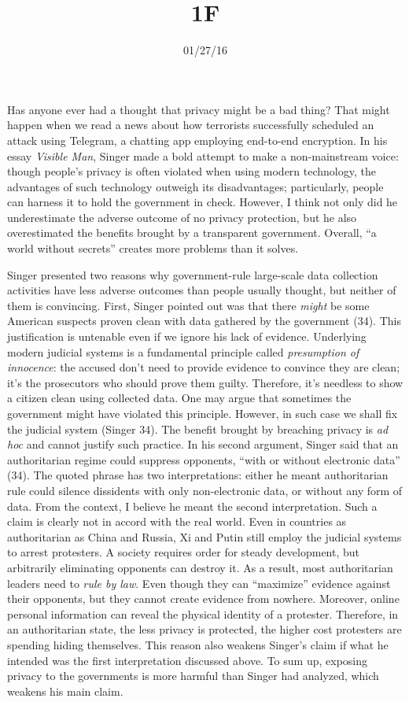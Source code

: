 \documentclass{writing}
\title{1F}
\date{01/27/16}
\begin{document}
\maketitle

Has anyone ever had a thought that privacy might be a bad thing? That
might happen when we read a news about how terrorists successfully
scheduled an attack using Telegram, a chatting app employing end-to-end
encryption. In his essay \emph{Visible Man}, Singer made a bold attempt
to make a non-mainstream voice: though people's privacy is often
violated when using modern technology, the advantages of such technology
outweigh its disadvantages; particularly, people can harness it to hold
the government in check. However, I think not only did he underestimate
the adverse outcome of no privacy protection, but he also overestimated
the benefits brought by a transparent government. Overall, ``a world
without secrets'' creates more problems than it solves.

Singer presented two reasons why government-rule large-scale data
collection activities have less adverse outcomes than people usually
thought, but neither of them is convincing. First, Singer pointed out
was that there \emph{might} be some American suspects proven clean with
data gathered by the government (34). This justification is untenable
even if we ignore his lack of evidence. Underlying modern judicial
systems is a fundamental principle called \emph{presumption of
innocence}: the accused don't need to provide evidence to convince they
are clean; it's the prosecutors who should prove them guilty. Therefore,
it's needless to show a citizen clean using collected data. One may
argue that sometimes the government might have violated this principle.
However, in such case we shall fix the judicial system (Singer 34). The
benefit brought by breaching privacy is \emph{ad hoc} and cannot justify
such practice. In his second argument, Singer said that an authoritarian
regime could suppress opponents, ``with or without electronic data''
(34). The quoted phrase has two interpretations: either he meant
authoritarian rule could silence dissidents with only non-electronic
data, or without any form of data. From the context, I believe he meant
the second interpretation. Such a claim is clearly not in accord with
the real world. Even in countries as authoritarian as China and Russia,
Xi and Putin still employ the judicial systems to arrest protesters. A
society requires order for steady development, but arbitrarily
eliminating opponents can destroy it. As a result, most authoritarian
leaders need to \emph{rule by law}. Even though they can ``maximize''
evidence against their opponents, but they cannot create evidence from
nowhere. Moreover, online personal information can reveal the physical
identity of a protester. Therefore, in an authoritarian state, the less
privacy is protected, the higher cost protesters are spending hiding
themselves. This reason also weakens Singer's claim if what he intended
was the first interpretation discussed above. To sum up, exposing
privacy to the governments is more harmful than Singer had analyzed,
which weakens his main claim.
\end{document}
